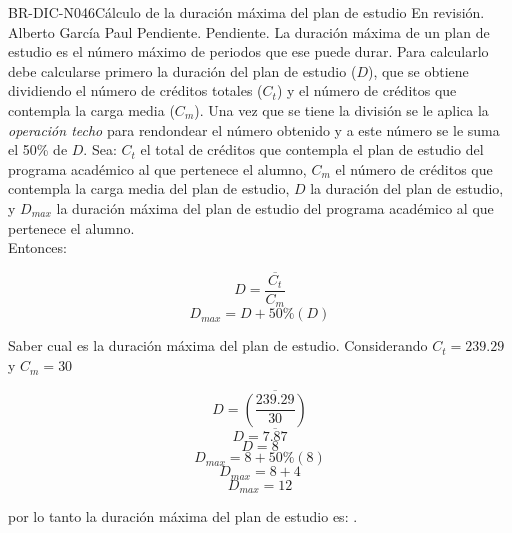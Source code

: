 \begin{BusinessRule}{BR-DIC-N046}{Cálculo de la duración máxima del plan de estudio}
	{\bcCondition} %
	{\btTimer}     %
	{\blInfluencing}     %
	\BRItem[Estado] En revisión.
	  Alberto García Paul
	 Pendiente.
	 Pendiente.
	\BRItem[Descripción] La duración máxima de un plan de estudio es el número máximo de periodos que ese puede durar. Para calcularlo debe calcularse primero la duración del plan de estudio ($D$), que se obtiene dividiendo el número de créditos totales ($C_{t}$) y el número de créditos que contempla la carga media ($C_{m}$). Una vez que se tiene la división se le aplica la \textit{operación techo} para rendondear el número obtenido y a este número se le suma el 50\% de $D$.
	\BRItem[Sentencia] \cdtEmpty
	Sea: $C_{t}$ el total de créditos que contempla el plan de estudio del programa académico al que pertenece el alumno, $C_{m}$ el número de créditos que contempla la carga media del plan de estudio, $D$ la duración del plan de estudio, y $D_{max}$ la duración máxima del plan de estudio del programa académico al que pertenece el alumno. \\
	Entonces:
	\begin{center}
		\[D = \overline{\frac{C_{t}}{C_{m}}}\]
		\[D_{max} = D + 50\%(D)\]
	\end{center} 
	\BRItem[Motivación] Saber cual es la duración máxima del plan de estudio.
	\BRItem[Ejemplo 1] \cdtEmpty
	Considerando $C_{t} = 239.29$ y $C_{m} = 30$
	\begin{center}
		\[D = \overline{(\frac{239.29}{30})}\]
		\[D = \overline{7.87}\]
		\[D = 8\] 
		\[D_{max} = 8 + 50\%(8)\] 
		\[D_{max} = 8 + 4\]
		\[D_{max} = 12\]
	\end{center}
	por lo tanto la duración máxima del plan de estudio es: .
\end{BusinessRule}


